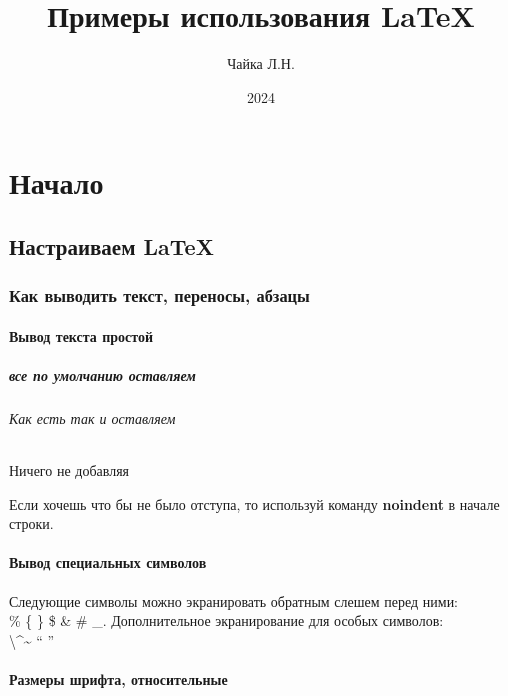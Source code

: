 \documentclass[a4paper,14pt]{book}
\title{Примеры использования \LaTeX}
\author{Чайка Л.Н.}
\date{2024}
\begin{document}
\layout

\maketitle %

\part{Начало}

\chapter{Настраиваем \LaTeX}

\section{Как выводить текст, переносы, абзацы}

\subsection{Вывод текста простой}

\subsubsection{все по умолчанию оставляем}

\paragraph{Как есть так и оставляем}

\subparagraph{Ничего не добавляя}
Если хочешь что бы не было отступа, то используй команду
\textbf{noindent} в начале строки.\newline
\subsection{Вывод специальных символов}
Следующие символы можно экранировать обратным слешем
перед ними: \\
\% \{ \} \$ \& \# \_. Дополнительное экранирование для особых
символов: \\ \textbackslash  \textasciicircum \~{}  `` ''

\subsection{Размеры шрифта, относительные}

\normalsize
\end{document}
